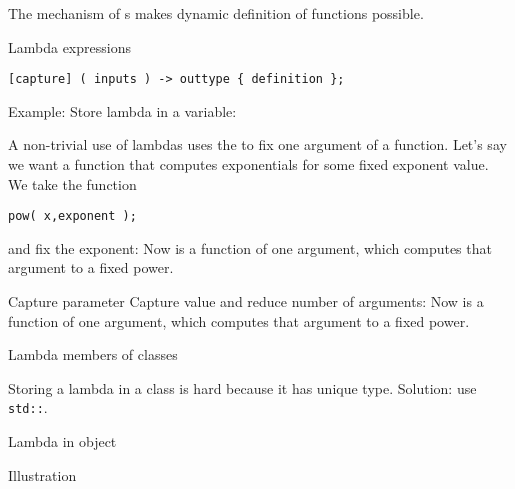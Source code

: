 
The mechanism of s makes
dynamic definition of functions possible.

\begin{block}{Lambda expressions}
  \label{sl:lambda-syntax}
\begin{verbatim}
[capture] ( inputs ) -> outtype { definition };
\end{verbatim}
Example:
Store lambda in a variable:
\end{block}

A non-trivial use of lambdas uses the  to fix one argument of a
function.
Let's say we want a function that computes exponentials for some fixed
exponent value. We take the 
 function
\begin{verbatim}
pow( x,exponent );
\end{verbatim}
and fix the exponent:
%
%
Now  is a function of one argument, which computes
that argument to a fixed power.

\begin{slide}{Capture parameter}
  \label{sl:lambda-capture}
  Capture value and reduce number of arguments:
  Now  is a function of one argument, which computes
  that argument to a fixed power.
\end{slide}

 {Lambda members of classes}

Storing a lambda in a class is hard because it has unique
type. Solution: use \lstinline{std::}.

\begin{block}{Lambda in object}
  \label{sl:lambda-class}
\end{block}

\begin{block}{Illustration}
  \label{sl:lambda-classed}
\end{block}


